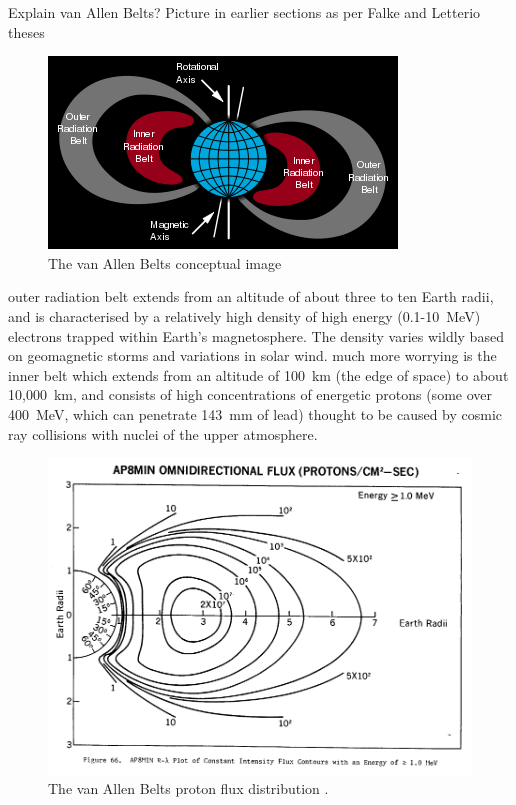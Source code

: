 Explain van Allen Belts? Picture in earlier sections as per Falke and Letterio theses
\begin{figure}
\includegraphics[width=\textwidth]{Images/350px-Van_Allen_radiation_belt_svg.png}
\caption{The van Allen Belts conceptual image}\label{fig:vabs}
\end{figure}
outer radiation belt extends from an altitude of about three to ten Earth radii, and is characterised by a relatively high density of high energy (0.1-10~MeV) electrons trapped within Earth's magnetosphere. The density varies wildly based on geomagnetic storms and variations in solar wind.
much more worrying is the inner belt which extends from an altitude of 100~km (the edge of space) to about 10,000~km, and consists of high concentrations of energetic protons (some over 400~MeV, which can penetrate 143~mm of lead) thought to be caused by cosmic ray collisions with nuclei of the upper atmosphere.
\begin{figure}
\includegraphics[width=\textwidth]{Images/Ap8-omni-1_000MeV.png}
\caption{The van Allen Belts proton flux distribution \parencite{Sawyer1976}.}\label{fig:vabs}
\end{figure}

